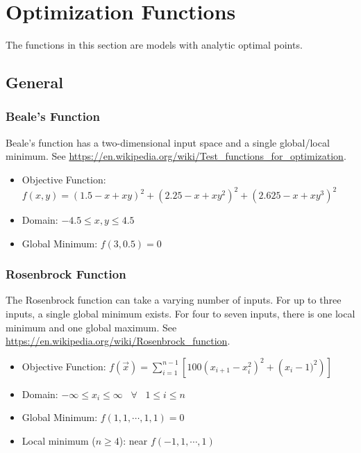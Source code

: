 \section{Optimization Functions}

The functions in this section are models with analytic optimal points.

\subsection{General}

\subsubsection{Beale's Function}
Beale's function has a two-dimensional input space and a single global/local minimum.
See \url{https://en.wikipedia.org/wiki/Test_functions_for_optimization}.

\begin{itemize}
  \item Objective Function: $f(x,y) = (1.5-x+xy)^2+(2.25-x+xy^2)^2+(2.625-x+xy^3)^2$
  \item Domain: $-4.5 \leq x,y \leq 4.5$
  \item Global Minimum: $f(3,0.5)=0$
\end{itemize}


\subsubsection{Rosenbrock Function}
The Rosenbrock function can take a varying number of inputs.  For up to three inputs, a single global minimum
exists.  For four to seven inputs, there is one local minimum and one global maximum.
See \url{https://en.wikipedia.org/wiki/Rosenbrock_function}.

\begin{itemize}
  \item Objective Function: $f(\vec x) = \sum_{i=1}^{n-1}\left[100\left(x_{i+1}-x_i^2\right)^2+\left(x_i-1)^2\right) \right]$
  \item Domain: $ -\infty \leq x_i \leq \infty \hspace{10pt} \forall \hspace{10pt} 1\leq i \leq n$
  \item Global Minimum: $f(1,1,\cdots,1,1)=0$
  \item Local minimum ($n\geq4$): near $f(-1,1,\cdots,1)$
\end{itemize}


